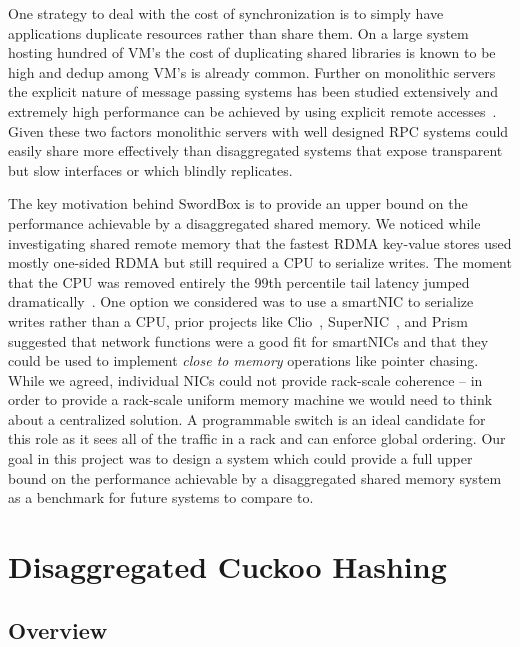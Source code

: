 \documentclass[12pt]{ucsddissertation}
\newcommand{\sword}{SwordBox}
\begin{document}
One strategy to deal with the cost of synchronization is to simply have applications duplicate
resources rather than share them. On a large system hosting hundred of VM's the cost of duplicating
shared libraries is known to be high and dedup among VM's is already common.  Further on monolithic
servers the explicit nature of message passing systems has been studied extensively and extremely
high performance can be achieved by using explicit remote accesses~\cite{herd, erpc}. Given these two
factors monolithic servers with well designed RPC systems could easily share more effectively than
disaggregated systems that expose transparent but slow interfaces or which blindly replicates.

The key motivation behind {\sword} is to provide an upper bound on the performance achievable by a
disaggregated shared memory. We noticed while investigating shared remote memory that the fastest
RDMA key-value stores used mostly one-sided RDMA but still required a CPU to serialize writes. The
moment that the CPU was removed entirely the 99th percentile tail latency jumped
dramatically~\cite{clover}. One option we considered was to use a smartNIC to serialize writes
rather than a CPU, prior projects like Clio~\cite{clio}, SuperNIC~\cite{supernic}, and
Prism~\cite{prism} suggested that network functions were a good fit for smartNICs and that they
could be used to implement \textit{close to memory} operations like pointer chasing. While we
agreed, individual NICs could not provide rack-scale coherence -- in order to provide a rack-scale
uniform memory machine we would need to think about a centralized solution. A programmable switch is
an ideal candidate for this role as it sees all of the traffic in a rack and can enforce global
ordering. Our goal in this project was to design a system which could provide a full upper bound on
the performance achievable by a disaggregated shared memory system as a benchmark for future systems
to compare to.











\chapter{Disaggregated Cuckoo Hashing}
\label{chap:rcuckoo}
\section{Overview}
\end{document}
